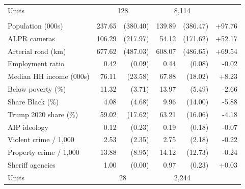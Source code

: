 \begin{table}[htbp]
\begin{tabular}{@{}lrrrrr@{}}
\addlinespace Units & \multicolumn{2}{c}{128} & \multicolumn{2}{c}{8,114} & \\
\addlinespace
\multicolumn{6}{@{}l}{\textit{Panel B. Counties}} \\[2pt]
Population (000s) & 237.65 & (380.40) & 139.89 & (386.47) & +97.76 \\
ALPR cameras & 106.29 & (217.97) & 54.12 & (171.62) & +52.17 \\
Arterial road (km) & 677.62 & (487.03) & 608.07 & (486.65) & +69.54 \\
Employment ratio & 0.42 & (0.09) & 0.44 & (0.08) & -0.02 \\
Median HH income (000s) & 76.11 & (23.58) & 67.88 & (18.02) & +8.23 \\
Below poverty (\%) & 11.32 & (3.71) & 13.97 & (5.49) & -2.66 \\
Share Black (\%) & 4.08 & (4.68) & 9.96 & (14.00) & -5.88 \\
Trump 2020 share (\%) & 59.02 & (17.62) & 63.21 & (16.06) & -4.18 \\
AIP ideology & 0.12 & (0.23) & 0.19 & (0.18) & -0.07 \\
Violent crime / 1{,}000 & 2.53 & (2.35) & 2.75 & (2.18) & -0.22 \\
Property crime / 1{,}000 & 13.88 & (8.95) & 14.12 & (12.73) & -0.24 \\
Sheriff agencies & 1.00 & (0.00) & 0.97 & (0.23) & +0.03 \\
\addlinespace Units & \multicolumn{2}{c}{28} & \multicolumn{2}{c}{2,244} & \\
\bottomrule
\end{tabular}
\end{table}

